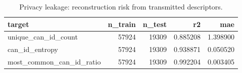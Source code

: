 \begin{table}[t]
\centering
\begin{tabular}{lrrrr}
\toprule
target & n\_train & n\_test & r2 & mae \\
\midrule
unique\_can\_id\_count & 57924 & 19309 & 0.885208 & 1.398900 \\
can\_id\_entropy & 57924 & 19309 & 0.938871 & 0.050520 \\
most\_common\_can\_id\_ratio & 57924 & 19309 & 0.992204 & 0.003405 \\
\bottomrule
\end{tabular}
\caption{Privacy leakage: reconstruction risk from transmitted descriptors.}
\label{tab:privacy-recon}
\end{table}
